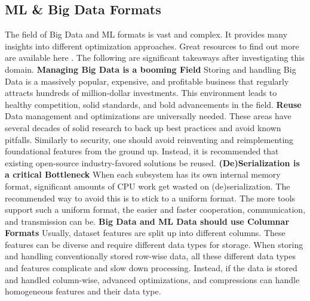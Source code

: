 \subsection{ML \& Big Data Formats}

The field of Big Data and ML formats is vast and complex.
It provides many insights into different optimization approaches.
Great resources to find out more are available here \cite{influxdb_apache_stack,apache_arrow_flight_sql_2022,columnar_roadmap_parquet_and_arrow,apache_arrow_flight_intro}.
The following are significant takeaways after investigating this domain.
\vspace{5mm}
\newline
\textbf{Managing Big Data is a booming Field}\newline
Storing and handling Big Data is a massively popular, expensive, and profitable business that regularly attracts hundreds of million-dollar investments.
This environment leads to healthy competition, solid standards, and bold advancements in the field.
\vspace{5mm}
\newline
\textbf{Reuse}\newline
Data management and optimizations are universally needed.
These areas have several decades of solid research to back up best practices and avoid known pitfalls.
Similarly to security, one should avoid reinventing and reimplementing foundational features from the ground up.
Instead, it is recommended that existing open-source industry-favored solutions be reused.
\vspace{5mm}
\newline
\textbf{(De)Serialization is a critical Bottleneck}\newline
When each subsystem has its own internal memory format, significant amounts of CPU work get wasted on (de)serialization.
The recommended way to avoid this is to stick to a uniform format.
The more tools support such a uniform format, the easier and faster cooperation, communication, and transmission can be.
\vspace{5mm}
\newline
\textbf{Big Data and ML Data should use Columnar Formats}\newline
Usually, dataset features are split up into different columns.
These features can be diverse and require different data types for storage.
When storing and handling conventionally stored row-wise data, all these different data types and features complicate and slow down processing.
Instead, if the data is stored and handled column-wise, advanced optimizations, and compressions can handle homogeneous features and their data type.
